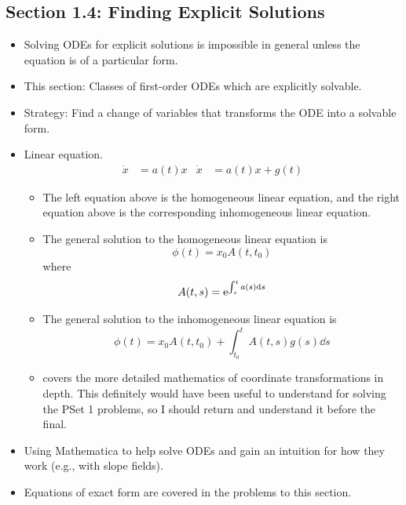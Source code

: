 \documentclass[../notes.tex]{subfiles}
\begin{document}
\subsection*{Section 1.4: Finding Explicit Solutions}
\begin{itemize}
    \item Solving ODEs for explicit solutions is impossible in general unless the equation is of a particular form.
    \item This section: Classes of first-order ODEs which are explicitly solvable.
    \item Strategy: Find a change of variables that transforms the ODE into a solvable form.
    \item Linear equation.
    \begin{align*}
        \dot{x} &= a(t)x&
        \dot{x} &= a(t)x+g(t)
    \end{align*}
    \begin{itemize}
        \item The left equation above is the homogeneous linear equation, and the right equation above is the corresponding inhomogeneous linear equation.
        \item The general solution to the homogeneous linear equation is
        \begin{equation*}
            \phi(t) = x_0A(t,t_0)
        \end{equation*}
        where
        \begin{equation*}
            A(t,s) = \e[\int_s^ta(s)\dd{s}]
        \end{equation*}
        \item The general solution to the inhomogeneous linear equation is
        \begin{equation*}
            \phi(t) = x_0A(t,t_0)+\int_{t_0}^tA(t,s)g(s)\dd{s}
        \end{equation*}
        \item \textcite{bib:Teschl} covers the more detailed mathematics of coordinate transformations in depth. This definitely would have been useful to understand for solving the PSet 1 problems, so I should return and understand it before the final.
    \end{itemize}
    \item Using Mathematica to help solve ODEs and gain an intuition for how they work (e.g., with slope fields).
    \item Equations of exact form are covered in the problems to this section.
\end{itemize}
\end{document}
